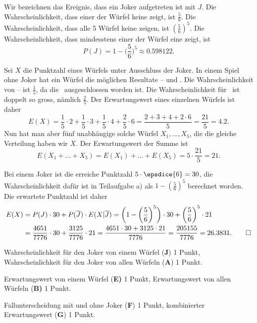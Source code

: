\begin{loesung}
\begin{teilaufgaben}
\item
Wir bezeichnen das Ereignis, dass ein Joker aufgetreten ist mit $J$.
Die Wahrscheinlichkeit, dass einer der Würfel keine  zeigt,
ist $\frac{5}{6}$. 
Die Wahrscheinlichkeit, dass alle 5 Würfel keine  zeigen, ist
$(\frac{5}{6})^5$.
Die Wahrscheinlichkeit, dass mindesstens einer der Würfel eine 
zeigt, ist
\[
P(J)
=
1-\biggl(\frac{5}{6}\biggr)^5\approx 0.598122.
\]
\item
Sei $X$ die Punktzahl eines Würfels unter Ausschluss der Joker.
In einem Spiel ohne Joker hat ein Würfel die möglichen Resultate
-- und .
Die Wahrscheinlichkeit von -- ist $\frac{1}{5}$,
da die  ausgeschlossen worden ist.
Die Wahrscheinlichkeit für  ist doppelt so gross, nämlich
$\frac{2}{5}$.
Der Erwartungswert eines einzelnen Würfels ist daher
\[
E(X)
=
\frac15\cdot 2
+
\frac15\cdot 3
+
\frac15\cdot 4
+
\frac25\cdot 6
=
\frac{2+3+4+2\cdot 6}5
=
\frac{21}{5} = 4.2.
\]
Nun hat man aber fünf unabhängige solche Würfel $X_1,\dots,X_5$,
die die gleiche Verteilung haben wir $X$.
Der Erwartungswert der Summe ist
\[
E(X_1+\dots+X_5)
=
E(X_1)+\dots+E(X_5)
=
5\cdot \frac{21}{5} = 21.
\]
\item
Bei einem Joker ist die erreiche Punktzahl $5\cdot\epsdice{6}=30$,
die Wahrscheinlichkeit dafür ist in Teilaufgabe a)
als $1-(\frac{5}{6})^5$ berechnet worden.
Die erwartete Punktzahl ist daher
\begin{align*}
E(X)
&=
P(J)
\cdot 30
+
P(\overline{J})
\cdot E(X|\overline{J})
=
\biggl(
1-
\biggl( \frac{5}{6}\biggr)^5
\biggr)
\cdot 30
+
\biggl( \frac{5}{6}\biggr)^5
\cdot 21
\\
&=
\frac{4651}{7776}\cdot 30 + \frac{3125}{7776}\cdot 21
=
\frac{4651\cdot 30 + 3125\cdot 21}{7776}
=
\frac{205155}{7776}
=
26.3831.
\qedhere
\end{align*}
\end{teilaufgaben}
\end{loesung}

\begin{bewertung}
\begin{teilaufgaben}
\item
Wahrscheinlichkeit für den Joker von einem Würfel ({\bf J}) 1 Punkt,
Wahrscheinlichkeit für den Joker von allen Würfeln ({\bf A}) 1 Punkt.
\item
Erwartungswert von einem Würfel {(\bf E)} 1 Punkt,
Erwartungswert von allen Würfeln {(\bf B)} 1 Punkt.
\item
Fallunterscheidung mit und ohne Joker ({\bf F}) 1 Punkt,
kombinierter Erwartungswert ({\bf G}) 1 Punkt.
\end{teilaufgaben}
\end{bewertung}

